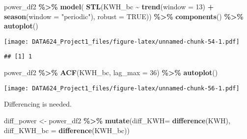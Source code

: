 \documentclass[
]{article}
\newenvironment{Shaded}{\begin{snugshade}}{\end{snugshade}}
\newcommand{\AttributeTok}[1]{\textcolor[rgb]{0.13,0.29,0.53}{#1}}
\newcommand{\ConstantTok}[1]{\textcolor[rgb]{0.56,0.35,0.01}{#1}}
\newcommand{\DecValTok}[1]{\textcolor[rgb]{0.00,0.00,0.81}{#1}}
\newcommand{\FunctionTok}[1]{\textcolor[rgb]{0.13,0.29,0.53}{\textbf{#1}}}
\newcommand{\NormalTok}[1]{#1}
\newcommand{\OtherTok}[1]{\textcolor[rgb]{0.56,0.35,0.01}{#1}}
\newcommand{\SpecialCharTok}[1]{\textcolor[rgb]{0.81,0.36,0.00}{\textbf{#1}}}
\newcommand{\StringTok}[1]{\textcolor[rgb]{0.31,0.60,0.02}{#1}}
\begin{document}
\begin{Shaded}
\begin{Highlighting}[]
\NormalTok{power\_df2 }\SpecialCharTok{\%\textgreater{}\%}
  \FunctionTok{model}\NormalTok{(}
    \FunctionTok{STL}\NormalTok{(KWH\_bc }\SpecialCharTok{\textasciitilde{}} \FunctionTok{trend}\NormalTok{(}\AttributeTok{window =} \DecValTok{13}\NormalTok{) }\SpecialCharTok{+}
                   \FunctionTok{season}\NormalTok{(}\AttributeTok{window =} \StringTok{"periodic"}\NormalTok{),}
                      \AttributeTok{robust =} \ConstantTok{TRUE}\NormalTok{)) }\SpecialCharTok{\%\textgreater{}\%}
                        \FunctionTok{components}\NormalTok{() }\SpecialCharTok{\%\textgreater{}\%}
                            \FunctionTok{autoplot}\NormalTok{()}
\end{Highlighting}
\end{Shaded}

\texttt{[image: DATA624\_Project1\_files/figure-latex/unnamed-chunk-54-1.pdf]}

\begin{Shaded}
\end{Shaded}

\begin{verbatim}
## [1] 1
\end{verbatim}

\begin{Shaded}
\begin{Highlighting}[]
\NormalTok{power\_df2 }\SpecialCharTok{\%\textgreater{}\%} 
  \FunctionTok{ACF}\NormalTok{(KWH\_bc, }\AttributeTok{lag\_max =} \DecValTok{36}\NormalTok{) }\SpecialCharTok{\%\textgreater{}\%} 
  \FunctionTok{autoplot}\NormalTok{()}
\end{Highlighting}
\end{Shaded}

\texttt{[image: DATA624\_Project1\_files/figure-latex/unnamed-chunk-56-1.pdf]}

Differencing is needed.

\begin{Shaded}
\begin{Highlighting}[]
\NormalTok{diff\_power }\OtherTok{\textless{}{-}}\NormalTok{ power\_df2 }\SpecialCharTok{\%\textgreater{}\%} 
  \FunctionTok{mutate}\NormalTok{(}\AttributeTok{diff\_KWH=} \FunctionTok{difference}\NormalTok{(KWH), }\AttributeTok{diff\_KWH\_bc =} \FunctionTok{difference}\NormalTok{(KWH\_bc))}
\end{Highlighting}
\end{Shaded}
\end{document}

